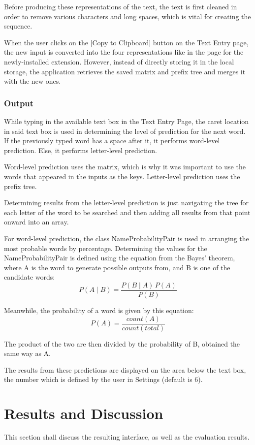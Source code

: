 \documentclass[journal]{./IEEE/IEEEtran}
\begin{document}
Before producing these representations of the text, the text is first cleaned in order to remove various characters and long spaces, which is vital for creating the sequence.

When the user clicks on the [Copy to Clipboard] button on the Text Entry page, the new input is converted into the four representations like in the page for the newly-installed extension. However, instead of directly storing it in the local storage, the application retrieves the saved matrix and prefix tree and merges it with the new ones.

\subsubsection{Output}
While typing in the available text box in the Text Entry Page, the caret location in said text box is used in determining the level of prediction for the next word. If the previously typed word has a space after it, it performs word-level prediction. Else, it performs letter-level prediction.

Word-level prediction uses the matrix, which is why it was important to use the words that appeared in the inputs as the keys. Letter-level prediction uses the prefix tree.

Determining results from the letter-level prediction is just navigating the tree for each letter of the word to be searched and then adding all results from that point onward into an array.

For word-level prediction, the class NameProbabilityPair is used in arranging the most probable words by percentage. Determining the values for the NameProbabilityPair is defined using the equation from the Bayes' theorem, where A is the word to generate possible outputs from, and B is one of the candidate words:
$$ P(A \mid B) = \frac{P(B \mid A) \, P(A)}{P(B)} $$

Meanwhile, the probability of a word is given by this equation:
$$ P(A) = \frac{count(A)}{count(total)} $$

The product of the two are then divided by the probability of B, obtained the same way as A.

The results from these predictions are displayed on the area below the text box, the number which is defined by the user in Settings (default is 6).

\section{Results and Discussion}
This section shall discuss the resulting interface, as well as the evaluation results.
\end{document}
